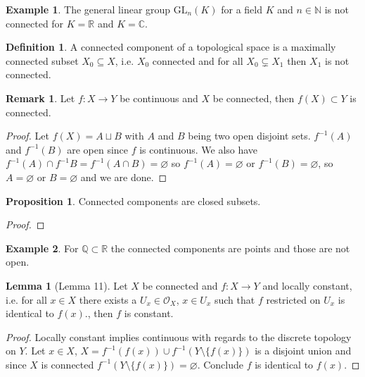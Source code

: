 \documentclass[a4paper]{book}
\theoremstyle{definition}
\newtheorem{definition}{Definition}[chapter]
\newtheorem{example}{Example}[definition]
\newtheorem{lemma}{Lemma}[definition]
\newtheorem{proposition}{Proposition}[definition]
\newtheorem*{remark}{Remark}
\begin{document}
    \begin{example}
        The general linear group \(\mathrm{GL}_n(K)\) for a field \(K\) and \(n \in \mathbb{N}\) is not connected for \(K = \mathbb{R}\) and \(K = \mathbb{C}\).
    \end{example}

    \begin{defbox}
        \begin{definition}
            A connected component of a topological space is a maximally connected subset \(X_0 \subseteq X\), i.e. \(X_0\) connected and for all \(X_0 \subsetneq X_1\) then \(X_1\) is not connected.
        \end{definition}
    \end{defbox}

    \begin{remark}
        Let \(f: X \longrightarrow Y\) be continuous and \(X\) be connected, then \(f(X) \subset Y\) is connected.
    \end{remark}
    \begin{proof}
        Let \(f(X) = A \sqcup B\) with \(A\) and \(B\) being two open disjoint sets. \(f^{-1}(A)\) and \(f^{-1}(B)\) are open since \(f\) is continuous. We also have \(f^{-1}(A) \cap f^{-1}B = f^{-1}(A \cap B) = \varnothing\) so \(f^{-1}(A) = \varnothing\) or \(f^{-1}(B) = \varnothing\), so \(A = \varnothing\) or \(B = \varnothing\) and we are done.
    \end{proof}
    \begin{proposition}
        Connected components are closed subsets.
    \end{proposition}
    \begin{proof}
    \end{proof}
    \begin{example}
        For \(\mathbb{Q} \subset \mathbb{R}\) the connected components are points and those are not open.
    \end{example}
    \begin{lemma}[Lemma 11]
        Let \(X\) be connected and \(f: X \longrightarrow Y\) and locally constant, i.e. for all \(x \in X\) there exists a \(U_x \in \mathcal{O}_X\), \(x \in U_x\) such that \(f\) restricted on \(U_x\) is identical to \(f(x)\)., then \(f\) is constant.
    \end{lemma}
    \begin{proof}
        Locally constant implies continuous with regards to the discrete topology on \(Y\). Let \(x \in X\), \(X = f^{-1}(f(x)) \cup f^{-1}(Y \setminus \{f(x)\})\) is a disjoint union and since \(X\) is connected \(f^{-1}(Y \setminus \{f(x)\}) = \varnothing\). Conclude \(f\) is identical to \(f(x)\).
    \end{proof}
\end{document}
